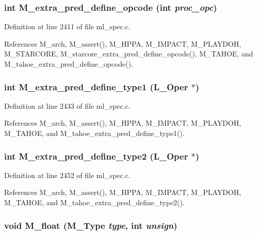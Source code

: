 \subsubsection{\setlength{\rightskip}{0pt plus 5cm}int M\_\-extra\_\-pred\_\-define\_\-opcode (int {\em proc\_\-opc})}\label{m__spec_8h_0f26ff16b9d8f5cd813b4cc20714e4cc}




Definition at line 2411 of file ml\_\-spec.c.

References M\_\-arch, M\_\-assert(), M\_\-HPPA, M\_\-IMPACT, M\_\-PLAYDOH, M\_\-STARCORE, M\_\-starcore\_\-extra\_\-pred\_\-define\_\-opcode(), M\_\-TAHOE, and M\_\-tahoe\_\-extra\_\-pred\_\-define\_\-opcode().
\subsubsection{\setlength{\rightskip}{0pt plus 5cm}int M\_\-extra\_\-pred\_\-define\_\-type1 (L\_\-Oper $\ast$)}\label{m__spec_8h_41b68d73f032fcd0f87c25d7bf0e82b8}




Definition at line 2433 of file ml\_\-spec.c.

References M\_\-arch, M\_\-assert(), M\_\-HPPA, M\_\-IMPACT, M\_\-PLAYDOH, M\_\-TAHOE, and M\_\-tahoe\_\-extra\_\-pred\_\-define\_\-type1().
\subsubsection{\setlength{\rightskip}{0pt plus 5cm}int M\_\-extra\_\-pred\_\-define\_\-type2 (L\_\-Oper $\ast$)}\label{m__spec_8h_5a24504a0f86b586f8806aa43fe99c42}




Definition at line 2452 of file ml\_\-spec.c.

References M\_\-arch, M\_\-assert(), M\_\-HPPA, M\_\-IMPACT, M\_\-PLAYDOH, M\_\-TAHOE, and M\_\-tahoe\_\-extra\_\-pred\_\-define\_\-type2().
\subsubsection{\setlength{\rightskip}{0pt plus 5cm}void M\_\-float (\bf{M\_\-Type} {\em type}, int {\em unsign})}\label{m__spec_8h_d02fbb71b3df1b6171d32483102508a2}




